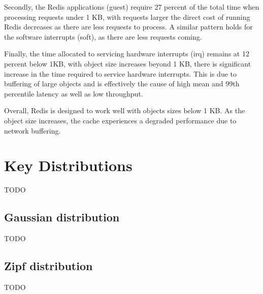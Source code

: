 Secondly, the Redis applications (guest) require 27 percent of the total time when processing requests under 1 KB, with requests larger the direct cost of running Redis decreases as there are less requests to process. A similar pattern holds for the software interrupts (soft), as there are less requests coming.

Finally, the time allocated to servicing hardware interrupts (irq) remains at 12 percent below 1KB, with object size increases beyond 1 KB, there is significant increase in the time required to service hardware interrupts. This is due to buffering of large objects and is effectively the cause of high mean and 99th percentile latency as well as low throughput.


Overall, Redis is designed to work well with objects sizes below 1 KB. As the object size increases, the cache experiences a degraded performance due to network buffering.

\section{Key Distributions}
TODO

\subsection{Gaussian distribution}
TODO

\subsection{Zipf distribution}
TODO